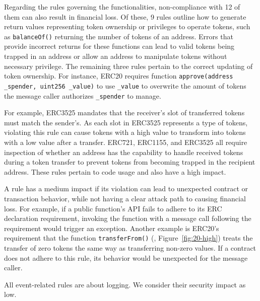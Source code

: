 Regarding the rules governing the functionalities, 
non-compliance with 12 of them can also result in financial loss. 
Of these, 9 rules outline how to generate return values 
representing token ownership or privileges to operate tokens, 
such as \texttt{balanceOf()} returning 
the number of tokens of an address.
Errors that provide incorrect returns for 
these functions can lead to valid tokens being trapped in an address
or allow an address to manipulate tokens without necessary privilege. 
The remaining three rules pertain to the correct updating of token ownership. 
For instance, ERC20 requires function \texttt{approve(address \_spender, uint256 \_value)} 
to use \texttt{\_value} to overwrite the amount of tokens 
the message caller authorizes \texttt{\_spender} to manage.


%
%
%
For example, ERC3525 mandates that the receiver's slot 
of transferred tokens must match the sender's. 
As each slot in ERC3525 represents a type of tokens, 
violating this rule can cause tokens with a high value to 
transform into tokens with a low value after a transfer. 
ERC721, ERC1155, and ERC3525 all require inspection 
of whether an address has the capability to handle received tokens 
during a token transfer to prevent tokens from becoming 
trapped in the recipient address. These rules pertain to code usage and also have a high impact.
\fi



A rule has a medium impact if its violation can lead 
to unexpected contract or transaction behavior, while not having a clear attack path 
to causing financial loss. For example, if a public function's API fails 
to adhere to its ERC declaration requirement, 
invoking the function with a message call following the requirement 
would trigger an exception. Another example is ERC20's requirement 
that the function \texttt{transferFrom()} (\eg, Figure~\ref{fig:20-high}) treats the 
transfer of zero tokens the same way as transferring non-zero values. 
If a contract does not adhere to this rule, its behavior would be 
unexpected for the message caller.


All event-related rules are about logging. We consider their security impact as low. 



